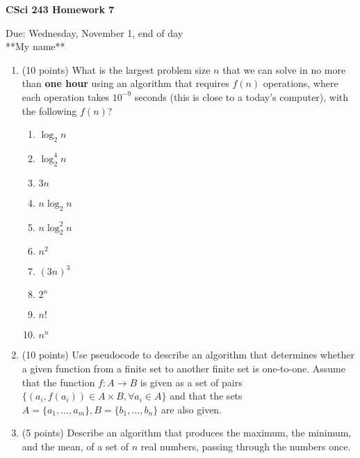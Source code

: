 \documentclass[11pt]{article}
\begin{document}
\begin{center}             %
\begin{LARGE}
{\bf CSci 243 Homework 7}
\end{LARGE}
\vskip 0.25cm      %

Due: Wednesday, November 1, end of day \\  %
**My name**
\end{center}

\begin{enumerate}

\item (10 points)
What is the largest problem size $n$ that we can solve in no more than
{\bf  one hour} using an algorithm that requires $f(n)$ operations,
where each operation takes $10^{-9}$ seconds (this is close to a today's computer),
with the following $f(n)$?
\begin{multicols}{2}
\begin{enumerate}
\item $\log_2 n$
\item $\log^4_2 n$
\item $3n$
\item $n\log_2 n$
\item $n\log^2_2 n$
\item $n^2$
\item $(3n)^3$
\item $2^n$
\item $n!$
\item $n^n$
\end{enumerate}
\end{multicols}


\item (10 points) 
Use pseudocode to describe an algorithm that determines whether a 
given function from a finite set to another finite set is one-to-one. Assume that the function $f: A\rightarrow B$ is given as a set of pairs $\{(a_i,f(a_i))\in A\times B, \forall a_i\in A\}$ and that the sets
$A =\{a_1,\ldots,a_m\}, B =\{b_1,\ldots,b_n\} $ are also given.

\item (5 points)
Describe an algorithm that produces the maximum, the minimum, and the mean, 
of a set of $n$ real numbers, passing through the numbers once. 



\end{enumerate}
\end{document}
